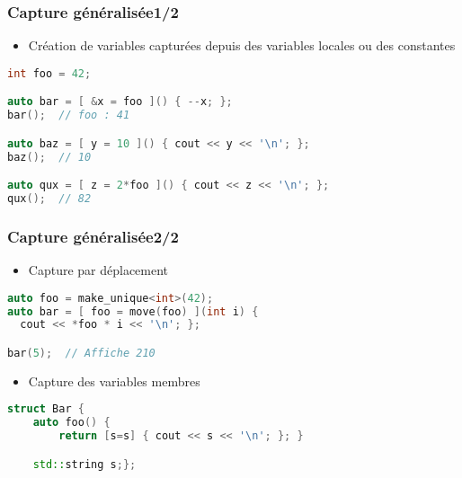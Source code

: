 \documentclass[C++.tex]{subfiles}
\begin{document}
\begin{frame}[fragile]
	\frametitle{Capture généralisée\titlehfill{}1/2}


	\begin{itemize}
		\item Création de variables capturées depuis des variables locales ou des constantes
	\end{itemize}

	\begin{lstlisting}[language=C++]
int foo = 42;

auto bar = [ &x = foo ]() { --x; };
bar();  // foo : 41

auto baz = [ y = 10 ]() { cout << y << '\n'; };
baz();  // 10

auto qux = [ z = 2*foo ]() { cout << z << '\n'; };
qux();  // 82\end{lstlisting}
\end{frame}

\begin{frame}[fragile]
	\frametitle{Capture généralisée\titlehfill{}2/2}
	\begin{itemize}
		\item Capture par déplacement
	\end{itemize}
	
	\begin{lstlisting}[language=C++]
auto foo = make_unique<int>(42);
auto bar = [ foo = move(foo) ](int i) {
  cout << *foo * i << '\n'; };

bar(5);  // Affiche 210\end{lstlisting}

	\begin{itemize}
		\item Capture des variables membres
	\end{itemize}

	\begin{lstlisting}[language=C++]
struct Bar {
	auto foo() {
		return [s=s] { cout << s << '\n'; }; }

	std::string s;};\end{lstlisting}
\end{frame}
\end{document}
